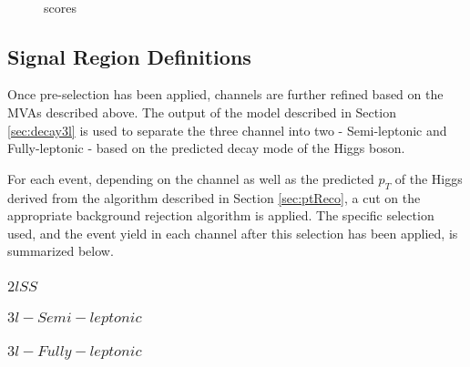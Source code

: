 \begin{figure}[H]
  \\
  \label{fig:sigBkgScore}
  \caption{scores}
\end{figure}


\subsection{Signal Region Definitions}
\label{subsec:sigRegions}

Once pre-selection has been applied, channels are further refined based on the MVAs described above. The output of the model described in Section \ref{sec:decay3l} is used to separate the three channel into two - Semi-leptonic and Fully-leptonic - based on the predicted decay mode of the Higgs boson. 

For each event, depending on the channel as well as the predicted $p_T$ of the Higgs derived from the algorithm described in Section \ref{sec:ptReco}, a cut on the appropriate background rejection algorithm is applied. The specific selection used, and the event yield in each channel after this selection has been applied, is summarized below.

\subsubsection{$2lSS$}

\subsubsection{$3l - Semi-leptonic$}

\subsubsection{$3l - Fully-leptonic$}
